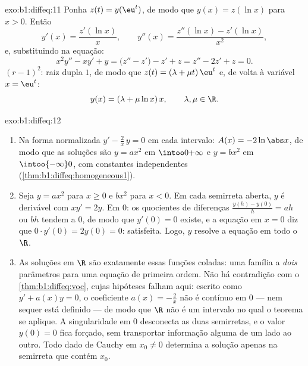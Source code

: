 \begin{solution}{exo:b1:diffeq:11}
Ponha $z(t) = y(\eu^t)$, de modo que $y(x) = z(\ln x)$ para $x > 0$. Então
\[
y'(x) = \frac{z'(\ln x)}x,
\qquad
y''(x) = \frac{z''(\ln x) - z'(\ln x)}{x^2} ,
\]
e, substituindo na equação:
\[
x^2y'' - xy' + y = \bigl(z'' - z'\bigr) - z' + z
= z'' - 2z' + z = 0 .
\]
 $(r - 1)^2$: raiz dupla $1$, de modo que $z(t) =
(\lambda + \mu t)\,\eu^t$ e, de volta à variável $x = \eu^t$:
\[
y(x) = (\lambda + \mu\ln x)\,x,
\qquad \lambda, \mu \in \R .
\]
\end{solution}

\begin{solution}{exo:b1:diffeq:12}
\begin{enumerate}
  \item Na forma normalizada $y' - \frac2x\,y = 0$ em cada intervalo:
        $A(x) = -2\ln\abs x$, de modo que as soluções são $y = a x^2$ em
        $\intoo0{+\infty}$ e $y = b x^2$ em $\intoo{-\infty}0$,
        com constantes independentes
        (\cref{thm:b1:diffeq:homogeneous1}).
  \item Seja $y = ax^2$ para $x \geq 0$ e $bx^2$ para $x < 0$. Em
        cada semirreta aberta, $y$ é derivável com $xy' = 2y$.
        Em $0$: os quocientes de diferenças $\frac{y(h) - y(0)}h =
        ah$
        ou $bh$ tendem a $0$, de modo que $y'(0) = 0$ existe, e a
        equação em $x = 0$ diz que $0 \cdot y'(0) = 2y(0) = 0$:
        satisfeita. Logo, $y$ resolve a equação em todo o $\R$.
  \item As soluções em $\R$ são exatamente essas funções coladas: uma
        família a \emph{dois} parâmetros para uma equação de primeira
        ordem. Não há contradição com o \cref{thm:b1:diffeq:voc},
        cujas hipóteses falham aqui: escrito como $y' + a(x)y = 0$,
        o coeficiente $a(x) = -\frac2x$ não é contínuo em $0$
        --- nem sequer está definido --- de modo que $\R$ não é um
        intervalo no qual o teorema se aplique. A singularidade em $0$
        desconecta as duas semirretas, e o valor $y(0) = 0$
        fica forçado, sem transportar informação alguma de um lado ao
        outro. Todo dado de Cauchy em $x_0 \neq 0$ determina a solução
        apenas na semirreta que contém $x_0$.
\end{enumerate}
\end{solution}


